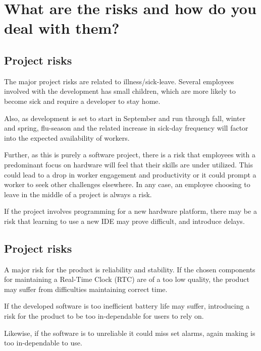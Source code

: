 \documentclass[Main]{subfiles}
\begin{document}
\section{What are the risks and how do you deal with them?}

\subsection{Project risks} %
\label{sub:project_risks}

The major project risks are related to illness/sick-leave.
Several employees involved with the development has small children, which are more likely to become sick and require a developer to stay home.

Also, as development is set to start in September and run through fall, winter and spring, flu-season and the related increase in sick-day frequency will factor into the expected availability of workers.

Further, as this is purely a software project, there is a risk that employees with a predominant focus on hardware will feel that their skills are under utilized. 
This could lead to a drop in worker engagement and productivity or it could prompt a worker to seek other challenges elsewhere.
In any case, an employee choosing to leave in the middle of a project is always a risk.

If the project involves programming for a new hardware platform, there may be a risk that learning to use a new IDE may prove difficult, and introduce delays.


\subsection{Project risks} %
\label{sub:project_risks}

A major risk for the product is reliability and stability.
If the chosen components for maintaining a Real-Time Clock (RTC) are of a too low quality, the product may suffer from difficulties maintaining correct time.

If the developed software is too inefficient battery life may suffer, introducing a risk for the product to be too in-dependable for users to rely on.

Likewise, if the software is to unreliable it could miss set alarms, again making is too in-dependable to use.

\end{document}
